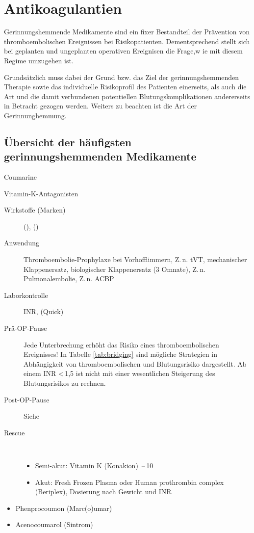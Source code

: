 \def\ChapterCode{EXPERT}
\chapter{Antikoagulantien}

Gerinnungshemmende Medikamente sind ein fixer Bestandteil
der Prävention von thromboembolischen Ereignissen bei
Risikopatienten. Dementsprechend stellt sich bei geplanten
und ungeplanten operativen Ereignisen die Frage,w ie mit
diesem Regime umzugehen ist.

Grundsätzlich muss dabei der Grund bzw. das Ziel der
gerinnungshemmenden Therapie sowie das individuelle
Risikoprofil des Patienten einerseits, als auch die Art und
die damit verbundenen potentiellen Blutungskomplikationen
andererseits in Betracht gezogen werden. Weiters zu beachten
ist die Art der Gerinnunghemmung. 


\section{Übersicht der häufigsten gerinnungshemmenden
Medikamente}

\TextSlide
{Coumarine}
{Vitamin-K-Antagonisten

\begin{description}
  \item[Wirkstoffe (Marken)] 
  (), 
  ()
  \item[Anwendung] Thromboembolie-Prophylaxe bei Vorhofflimmern,
  Z.\,n. tVT, mechanischer Klappenersatz, biologischer
  Klappenersatz (3 Omnate), Z.\,n. Pulmonalembolie, Z.\,n.
  ACBP
  \item[Laborkontrolle] INR, (Quick)
  \item[Prä-OP-Pause] Jede Unterbrechung erhöht das Risiko
  eines thromboembolischen Ereignisses! In Tabelle
  \ref{tab:bridging} sind mögliche Strategien in
  Abhängigkeit von thromboembolischen und Blutungsrisiko
  dargestellt. Ab einem INR <\,1,5 ist nicht mit einer
  wesentlichen Steigerung des Blutungsrisikos zu rechnen.
  \item[Post-OP-Pause] Siehe 
  \item[Rescue]~
  \begin{itemize}
    \item Semi-akut: Vitamin K (Konakion\texttrademark)
    \,--\,10\Mg*
    \item Akut: Fresh Frozen Plasma oder Human prothrombin
    complex (Beriplex{\texttrademark}), Dosierung nach
    Gewicht und INR
  \end{itemize}
\end{description}

}
{
\begin{itemize}
  \item Phenprocoumon
(Marc(o)umar{\texttrademark}) 
\item Acenocoumarol
(Sintrom{\texttrademark})
\end{itemize}
}
{}
{}
{}



